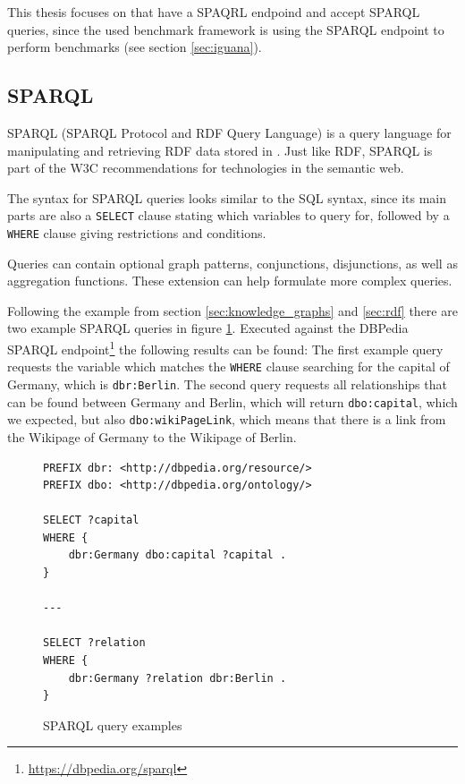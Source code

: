 This thesis focuses on \tsp{} that have a SPAQRL endpoind and accept SPARQL queries, since the used benchmark framework \iguana{} is using the SPARQL endpoint to perform benchmarks (see section \ref{sec:iguana}).


\subsection{SPARQL}
\label{sec:sparql}
SPARQL (SPARQL Protocol and RDF Query Language) \cite{harrisSPARQLQueryLanguage} is a query language for manipulating and retrieving RDF data stored in \tsp{}.
Just like RDF, SPARQL is part of the W3C recommendations for technologies in the semantic web.

The syntax for SPARQL queries looks similar to the SQL syntax, since its main parts are also a \texttt{SELECT} clause stating which variables to query for, followed by a \texttt{WHERE} clause giving restrictions and conditions.

Queries can contain optional graph patterns, conjunctions, disjunctions, as well as aggregation functions.
These extension can help formulate more complex queries.

Following the example from section \ref{sec:knowledge_graphs} and \ref{sec:rdf} there are two example SPARQL queries in figure \ref{fig:sparql_example}.
Executed against the DBPedia SPARQL endpoint\footnote{\url{https://dbpedia.org/sparql}} the following results can be found:
The first example query requests the variable which matches the \texttt{WHERE} clause searching for the capital of Germany, which is \texttt{dbr:Berlin}.
The second query requests all relationships that can be found between Germany and Berlin, which will return \texttt{dbo:capital}, which we expected, but also \texttt{dbo:wikiPageLink}, which means that there is a link from the Wikipage of Germany to the Wikipage of Berlin.

\begin{figure}[tbph]
	\begin{lstlisting}
PREFIX dbr: <http://dbpedia.org/resource/>
PREFIX dbo: <http://dbpedia.org/ontology/>

SELECT ?capital
WHERE {
	dbr:Germany dbo:capital ?capital .
}

---

SELECT ?relation
WHERE {
	dbr:Germany ?relation dbr:Berlin .
}
	\end{lstlisting}
	\caption{SPARQL query examples}
	\label{fig:sparql_example}
\end{figure}